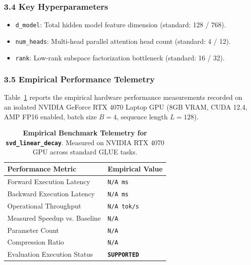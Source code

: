 \subsubsection*{3.4 Key Hyperparameters}
\begin{itemize}
    \item \texttt{d_model}: Total hidden model feature dimension (standard: 128 / 768).
    \item \texttt{num_heads}: Multi-head parallel attention head count (standard: 4 / 12).
    \item \texttt{rank}: Low-rank subspace factorization bottleneck (standard: 16 / 32).
\end{itemize}

\subsubsection*{3.5 Empirical Performance Telemetry}
Table~\ref{tab:telemetry_svd\_linear\_decay} reports the empirical hardware performance measurements recorded on an isolated NVIDIA GeForce RTX 4070 Laptop GPU (8GB VRAM, CUDA 12.4, AMP FP16 enabled, batch size $B=4$, sequence length $L=128$).

\begin{table}[h]
\centering
\small
\caption{\textbf{Empirical Benchmark Telemetry for \texttt{svd\_linear\_decay}}. Measured on NVIDIA RTX 4070 GPU across standard GLUE tasks.}
\label{tab:telemetry_svd\_linear\_decay}
\begin{tabularx}{\columnwidth}{lX}
\toprule
\textbf{Performance Metric} & \textbf{Empirical Value} \\
\midrule
Forward Execution Latency & \texttt{N/A ms} \\
Backward Execution Latency & \texttt{N/A ms} \\
Operational Throughput & \texttt{N/A tok/s} \\
Measured Speedup vs. Baseline & \texttt{N/A} \\
Parameter Count & \texttt{N/A} \\
Compression Ratio & \texttt{N/A} \\
Evaluation Execution Status & \textbf{\texttt{SUPPORTED}} \\
\bottomrule
\end{tabularx}
\end{table}

